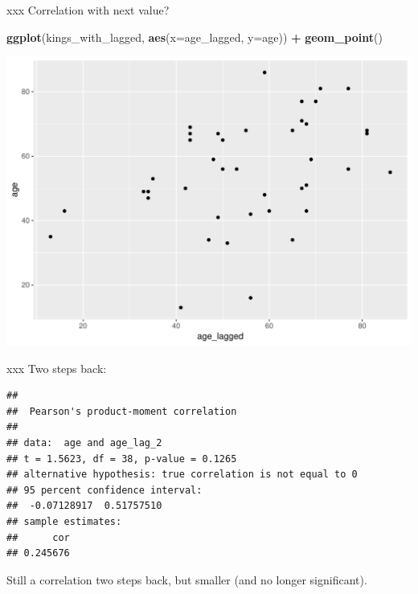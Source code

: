 \documentclass[ignorenonframetext,]{beamer}
\newenvironment{Shaded}{\begin{snugshade}}{\end{snugshade}}
\newcommand{\DataTypeTok}[1]{\textcolor[rgb]{0.13,0.29,0.53}{#1}}
\newcommand{\DecValTok}[1]{\textcolor[rgb]{0.00,0.00,0.81}{#1}}
\newcommand{\KeywordTok}[1]{\textcolor[rgb]{0.13,0.29,0.53}{\textbf{#1}}}
\newcommand{\NormalTok}[1]{#1}
\newcommand{\OperatorTok}[1]{\textcolor[rgb]{0.81,0.36,0.00}{\textbf{#1}}}
\newcommand{\StringTok}[1]{\textcolor[rgb]{0.31,0.60,0.02}{#1}}
\begin{document}
\begin{frame}[fragile]{xxx Correlation with next value?}
\protect\hypertarget{xxx-correlation-with-next-value}{}

\begin{Shaded}
\begin{Highlighting}[]
\KeywordTok{ggplot}\NormalTok{(kings_with_lagged, }\KeywordTok{aes}\NormalTok{(}\DataTypeTok{x=}\NormalTok{age_lagged, }\DataTypeTok{y=}\NormalTok{age)) }\OperatorTok{+}\StringTok{ }
\StringTok{  }\KeywordTok{geom_point}\NormalTok{()}
\end{Highlighting}
\end{Shaded}

\includegraphics{figure/unnamed-chunk-28-1.pdf}

\end{frame}

\begin{frame}[fragile]{xxx Two steps back:}
\protect\hypertarget{xxx-two-steps-back}{}

\small

\begin{Shaded}
\end{Shaded}

\begin{verbatim}
## 
##  Pearson's product-moment correlation
## 
## data:  age and age_lag_2
## t = 1.5623, df = 38, p-value = 0.1265
## alternative hypothesis: true correlation is not equal to 0
## 95 percent confidence interval:
##  -0.07128917  0.51757510
## sample estimates:
##      cor 
## 0.245676
\end{verbatim}

\normalsize

Still a correlation two steps back, but smaller (and no longer
significant).

\end{frame}
\end{document}
